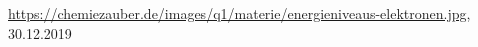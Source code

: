 \begin{thebibliography}{xxx}
        \url{https://chemiezauber.de/images/q1/materie/energieniveaus-elektronen.jpg},
		30.12.2019
\end{thebibliography}
 
